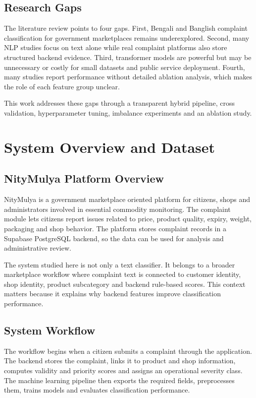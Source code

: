 \documentclass[12pt,a4paper,openany]{book}
\begin{document}
\section{Research Gaps}
The literature review points to four gaps. First, Bengali and Banglish complaint classification for government marketplaces remains underexplored. Second, many NLP studies focus on text alone while real complaint platforms also store structured backend evidence. Third, transformer models are powerful but may be unnecessary or costly for small datasets and public service deployment. Fourth, many studies report performance without detailed ablation analysis, which makes the role of each feature group unclear.

This work addresses these gaps through a transparent hybrid pipeline, cross validation, hyperparameter tuning, imbalance experiments and an ablation study.

\chapter{System Overview and Dataset}

\section{NityMulya Platform Overview}
NityMulya is a government marketplace oriented platform for citizens, shops and administrators involved in essential commodity monitoring. The complaint module lets citizens report issues related to price, product quality, expiry, weight, packaging and shop behavior. The platform stores complaint records in a Supabase PostgreSQL backend, so the data can be used for analysis and administrative review.

The system studied here is not only a text classifier. It belongs to a broader marketplace workflow where complaint text is connected to customer identity, shop identity, product subcategory and backend rule-based scores. This context matters because it explains why backend features improve classification performance.

\section{System Workflow}
The workflow begins when a citizen submits a complaint through the application. The backend stores the complaint, links it to product and shop information, computes validity and priority scores and assigns an operational severity class. The machine learning pipeline then exports the required fields, preprocesses them, trains models and evaluates classification performance.
\end{document}
